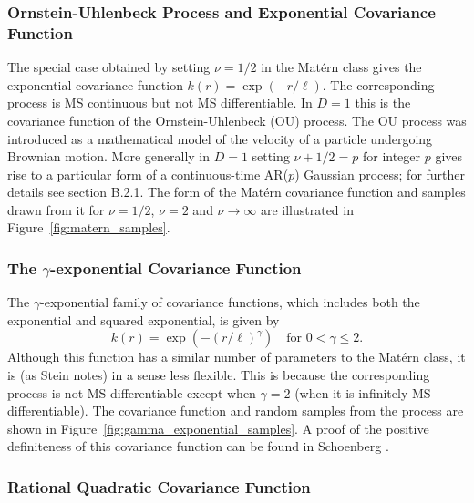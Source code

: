 \documentclass[11pt]{book}
\begin{document}
\subsubsection{Ornstein-Uhlenbeck Process and Exponential Covariance Function}

The special case obtained by setting $\nu = 1/2$ in the Matérn class gives the exponential covariance function $k(r) = \exp(-r/\ell)$. The corresponding process is MS continuous but not MS differentiable. In $D = 1$ this is the covariance function of the Ornstein-Uhlenbeck (OU) process. The OU process \cite{uhlenbeck1930} was introduced as a mathematical model of the velocity of a particle undergoing Brownian motion. More generally in $D = 1$ setting $\nu + 1/2 = p$ for integer $p$ gives rise to a particular form of a continuous-time AR($p$) Gaussian process; for further details see section B.2.1. The form of the Matérn covariance function and samples drawn from it for $\nu = 1/2$, $\nu = 2$ and $\nu \to \infty$ are illustrated in Figure~\ref{fig:matern_samples}.

\subsubsection{The $\gamma$-exponential Covariance Function}

The $\gamma$-exponential family of covariance functions, which includes both the exponential and squared exponential, is given by
\begin{equation}
\label{eq:gamma_exponential}
k(r) = \exp\left(-(r/\ell)^\gamma\right) \quad \text{for } 0 < \gamma \leq 2.
\end{equation}
Although this function has a similar number of parameters to the Matérn class, it is (as Stein \cite{stein1999} notes) in a sense less flexible. This is because the corresponding process is not MS differentiable except when $\gamma = 2$ (when it is infinitely MS differentiable). The covariance function and random samples from the process are shown in Figure~\ref{fig:gamma_exponential_samples}. A proof of the positive definiteness of this covariance function can be found in Schoenberg \cite{schoenberg1938}.

\subsubsection{Rational Quadratic Covariance Function}
\end{document}

